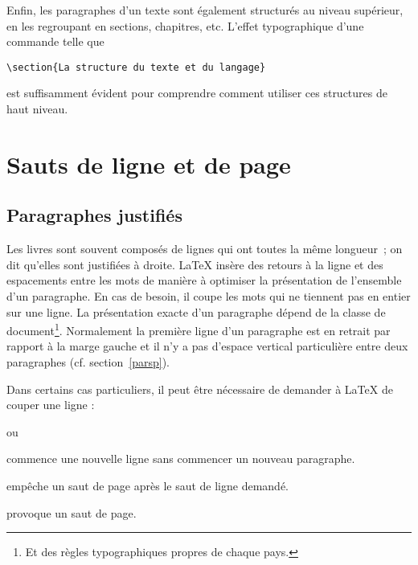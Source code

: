 Enfin, les paragraphes d'un texte sont également structurés au niveau
supérieur, en les regroupant en sections, chapitres, etc. L'effet
typographique d'une commande telle que
\begin{center}
\verb|\section{La structure du texte et du langage}|
\end{center}
\noindent est suffisamment évident pour
comprendre comment utiliser ces structures de haut niveau.

\section{Sauts de ligne et de page}

\subsection{Paragraphes justifiés}

Les livres sont souvent composés de lignes qui ont toutes la même
longueur~; on dit qu'elles sont justifiées à droite. \LaTeX{} insère
des retours à la ligne et des espacements entre les mots de manière à
optimiser la présentation de l'ensemble d'un paragraphe. En cas de
besoin, il coupe les mots qui ne tiennent pas en entier sur une
ligne. La présentation exacte d'un paragraphe dépend de la classe de
document\footnote{Et des règles typographiques propres de chaque pays.
\NdT}. Normalement la première ligne d'un paragraphe est
en retrait par rapport à la marge gauche
et il n'y a pas d'espace vertical particulière entre deux
paragraphes (cf. section~\ref{parsp}).

Dans certains cas particuliers, il peut être nécessaire de demander à
\LaTeX{} de couper une ligne :
\begin{lscommand}
\ci{\bs} ou 
\end{lscommand}
\noindent commence une nouvelle ligne sans commencer un nouveau
paragraphe.

\begin{lscommand}
\ci{\bs*}
\end{lscommand}
\noindent empêche un saut de page après le saut de ligne demandé.

\begin{lscommand}
\end{lscommand}
\noindent provoque un saut de page.

